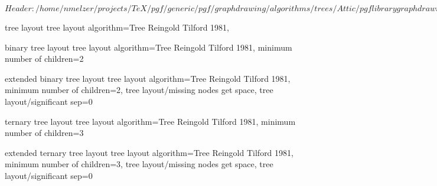 %
%
%

\ProvidesFileRCS[v\pgfversion] $Header: /home/nmelzer/projects/TeX/pgf/generic/pgf/graphdrawing/algorithms/trees/Attic/pgflibrarygraphdrawing.trees.code.tex,v 1.8 2012/04/15 22:28:07 tantau Exp $




%
%

%
%
% 
% 






%
%
\pgfgddeclarealgorithmkey
  {tree layout}
  {tree layout}
  {
    algorithm=Tree Reingold Tilford 1981,
  }

%
%
\pgfgddeclarealgorithmkey
  {binary tree layout}
  {tree layout}
  {
    algorithm=Tree Reingold Tilford 1981,
    minimum number of children=2
  }

%
%
\pgfgddeclarealgorithmkey
  {extended binary tree layout}
  {tree layout}
  {
    algorithm=Tree Reingold Tilford 1981,
    minimum number of children=2,
    tree layout/missing nodes get space,
    tree layout/significant sep=0
  }

%
%
\pgfgddeclarealgorithmkey
  {ternary tree layout}
  {tree layout}
  {
    algorithm=Tree Reingold Tilford 1981,
    minimum number of children=3
  }

%
%
\pgfgddeclarealgorithmkey
  {extended ternary tree layout}
  {tree layout}
  {
    algorithm=Tree Reingold Tilford 1981,
    minimum number of children=3,
    tree layout/missing nodes get space,
    tree layout/significant sep=0
  }





\endinput
